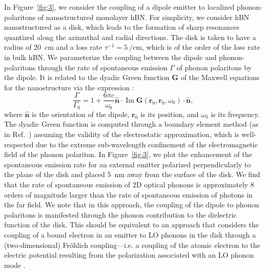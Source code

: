 \documentclass[aps,prb,twocolumn,
	           groupedaddress,superscriptaddress,
               amsfonts,amssymb,amsmath,floatfix,
	           citeautoscript]{revtex4-1}
\makeatletter
\renewcommand{\Im}{\operatorname{Im}}
\newcommand{\ie}{i.e.\@\xspace} %
\makeatother
\begin{document}
In Figure~\ref{fig:3}, we consider the coupling of a dipole emitter to localized phonon-polaritons of nanostructured monolayer hBN. For simplicity, we consider hBN nanostructured as a disk, which leads to the formation of sharp resonances quantized along the azimuthal and radial directions. The disk is taken to have a radius of \SI{20}{cm} and a loss rate $\tau^{-1} = \SI{5}{\per\cm}$, which is of the order of the loss rate in bulk hBN. We parameterize the coupling between the dipole and phonon-polaritons through the rate of spontaneous emission $\Gamma$ of phonon polaritons by the dipole. It is related to the dyadic Green function $\mathbf{G}$ of the Maxwell equations for the nanostructure via the expression \cite{novotny2012principles}:
\begin{equation}
\frac{\Gamma}{\Gamma_0} = 1 + \frac{6\pi c}{\omega_0}\hat{\mathbf{n}}\cdot\Im\mathbf{G}(\mathbf{r}_0,\mathbf{r}_0,\omega_0)\cdot\hat{\mathbf{n}},
\end{equation}
where $\hat{\mathbf{n}}$ is the orientation of the dipole, $\mathbf{r}_0$ is its position, and $\omega_0$ is its frequency. The dyadic Green function is computed through a boundary element method (as in Ref.~) assuming the validity of the electrostatic approximation, which is well-respected due to the extreme sub-wavelength confinement of the electromagnetic field of the phonon polariton. In Figure~\ref{fig:3}, we plot the enhancement of the spontaneous emission rate for an external emitter polarized perpendicularly to the plane of the disk and placed \SI{5}{\nm} away from the surface of the disk. We find that the rate of spontaneous emission of 2D optical phonons is approximately 8 orders of magnitude larger than the rate of spontaneous emission of photons in the far field. We note that in this approach, the coupling of the dipole to phonon polaritons is manifested through the phonon contribution to the dielectric function of the disk. This should be equivalent to an approach that considers the coupling of a bound electron in an emitter to LO phonons in the disk through a (two-dimensional) Fr\"ohlich coupling---\ie a coupling of the atomic electron to the electric potential resulting from the polarization associated with an LO phonon mode \cite{sohier2016two}.
\end{document}
